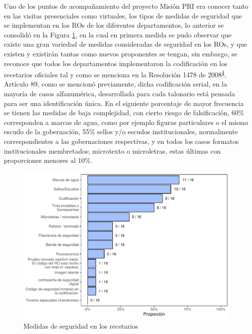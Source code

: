 \documentclass[
]{book}
\begin{document}
Uno de los puntos de acompañamiento del proyecto Misión PRI era conocer tanto en las visitas presenciales como virtuales, los tipos de medidas de seguridad que se implementan en los ROs de los diferentes departamentos, lo anterior se consolidó en la Figura \ref{fig:MedidasSeguridadRec}, en la cual en primera medida se pudo observar que existe una gran variedad de medidas consideradas de seguridad en los ROs, y que existen y existirán tantas como nuevos proponentes se tengan, sin embargo, se reconoce que todos los departamentos implementaron la codificación en los recetarios oficiales tal y como se menciona en la Resolución 1478 de 2008\textsuperscript{\protect\hyperlink{ref-MSPS1478-2006}{4}}, Artículo 89, como se mencionó previamente, dicha codificación serial, en la mayoría de casos alfanumérica, desarrollada para cada talonario está pensada para ser una identificación única. En el siguiente porcentaje de mayor frecuencia se tienen las medidas de baja complejidad, con cierto riesgo de falsificación, 60\% corresponden a marcas de agua, como por ejemplo figuras particulares o el mismo escudo de la gobernación, 55\% sellos y/o escudos institucionales, normalmente correspondientes a las gobernaciones respectivas, y en todos los casos formatos institucionales membretados; microtexto o microletras, estas últimas con proporciones menores al 10\%.

\begin{figure}
\includegraphics[width=0.9\linewidth]{InformeFinal_files/figure-latex/MedidasSeguridadRec-1} \caption{Medidas de seguridad en los recetarios}\label{fig:MedidasSeguridadRec}
\end{figure}
\end{document}
